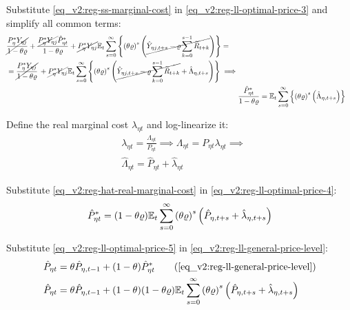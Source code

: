 \documentclass[../thesis.tex]{subfiles}
\begin{document}
Substitute \ref{eq_v2:reg-ss-marginal-cost} in \ref{eq_v2:reg-ll-optimal-price-3} and simplify all common terms:
\begin{align}
	\begin{split}
		& \cancel{\frac{P_{\eta}^{\ast} Y_{\eta j}}{1-\theta\varrho}} + \frac{ \cancel{P_{\eta}^{\ast} Y_{\eta j}} \hat{P}_{\eta t}^{\ast}}{1- \theta \varrho} + \cancel{P_{\eta}^{\ast} Y_{\eta j}} {\mathbb{E}_{t}} \sum_{s=0}^{\infty} \left\{ \left( \theta \varrho \right)^s \left( \cancel{\hat{Y}_{\eta j, t+s} - \varrho \sum_{k=0}^{s-1} \widetilde{R}_{t+k}} \right) \right\} = 
		\\
		& = \cancel{\frac{P_{\eta}^{\ast} Y_{\eta j}}{1-\theta\varrho}} \, + \cancel{P_{\eta}^{\ast} Y_{\eta j}} {\mathbb{E}_{t}} \sum_{s=0}^{\infty} \left\{ \left( \theta \varrho \right)^s \left( \cancel{\hat{Y}_{\eta j, t+s} - \varrho \sum_{k=0}^{s-1} \widetilde{R}_{t+k}} + \hat{\Lambda}_{\eta, t+s} \right) \right\} \implies	
	\end{split} \nonumber \\
	& \frac{ \hat{P}_{\eta t}^{\ast}}{1- \theta \varrho} = {\mathbb{E}_{t}} \sum_{s=0}^{\infty} \left\{ \left( \theta \varrho \right)^s \left( \hat{\Lambda}_{\eta, t+s} \right) \right\} \label{eq_v2:reg-ll-optimal-price-4}
\end{align}

Define the real marginal cost $\lambda_{\eta t}$ and log-linearize it:
\begin{align}
	& \lambda_{\eta t} = \frac{\Lambda_{\eta t}}{P_{\eta t}} \implies \Lambda_{\eta t} = P_{\eta t} \lambda_{\eta t} \implies \label{eq_v2:reg-real-marginal-cost} \\
	& \hat{\Lambda}_{\eta t} = \hat{P}_{\eta t} + \hat{\lambda}_{\eta t} \label{eq_v2:reg-hat-real-marginal-cost}
\end{align}

Substitute \ref{eq_v2:reg-hat-real-marginal-cost} in \ref{eq_v2:reg-ll-optimal-price-4}:
\begin{align}
	\hat{P}_{\eta t}^{\ast} = (1- \theta \varrho) {\mathbb{E}_{t}} \sum_{s=0}^{\infty} \left( \theta \varrho \right)^s \left( \hat{P}_{\eta, t+s} + \hat{\lambda}_{\eta, t+s} \right) \label{eq_v2:reg-ll-optimal-price-5}
\end{align}

Substitute \ref{eq_v2:reg-ll-optimal-price-5} in \ref{eq_v2:reg-ll-general-price-level}:
\begin{align}
	\hat{P}_{\eta t} &= \theta \hat{P}_{\eta, t-1} + (1-\theta) \hat{P}_{\eta t}^{\ast} \tag{\ref{eq_v2:reg-ll-general-price-level}}\\
	\hat{P}_{\eta t} &= \theta \hat{P}_{\eta, t-1} + (1-\theta) (1- \theta \varrho) \E \sum_{s=0}^{\infty} \left( \theta \varrho \right)^s \left( \hat{P}_{\eta, t+s} + \hat{\lambda}_{\eta, t+s} \right) \label{eq_v2:reg-ll-general-price-level-2}
\end{align}
\end{document}
